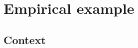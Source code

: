\documentclass[10pt,letterpaper]{article}
\providecommand{\DIFaddbegin}{} %
\providecommand{\DIFaddend}{} %
\providecommand{\DIFdelbegin}{} %
\providecommand{\DIFdelend}{} %
\newcommand{\DIFscaledelfig}{0.5}
\newlength{\DIFdelgraphicswidth} %
\newlength{\DIFdelgraphicsheight} %
\newcommand{\DIFaddincludegraphics}[2][]{{\color{blue}\fbox{\DIFOincludegraphics[#1]{#2}}}} %
\newcommand{\DIFdelincludegraphics}[2][]{%
\sbox{\DIFdelgraphicsbox}{\DIFOincludegraphics[#1]{#2}}%
\settoboxwidth{\DIFdelgraphicswidth}{\DIFdelgraphicsbox} %
\settoboxtotalheight{\DIFdelgraphicsheight}{\DIFdelgraphicsbox} %
\scalebox{\DIFscaledelfig}{%
\parbox[b]{\DIFdelgraphicswidth}{\usebox{\DIFdelgraphicsbox}\\[-\baselineskip] \rule{\DIFdelgraphicswidth}{0em}}\llap{\resizebox{\DIFdelgraphicswidth}{\DIFdelgraphicsheight}{%
\setlength{\unitlength}{\DIFdelgraphicswidth}%
\begin{picture}(1,1)%
\thicklines\linethickness{2pt} %
{\color[rgb]{1,0,0}\put(0,0){\framebox(1,1){}}}%
{\color[rgb]{1,0,0}\put(0,0){\line( 1,1){1}}}%
{\color[rgb]{1,0,0}\put(0,1){\line(1,-1){1}}}%
\end{picture}%
}\hspace*{3pt}}} %
} %
\DeclareRobustCommand{\DIFaddbegin}{\DIFOaddbegin \let\includegraphics\DIFaddincludegraphics} %
\DeclareRobustCommand{\DIFaddend}{\DIFOaddend \let\includegraphics\DIFOincludegraphics} %
\DeclareRobustCommand{\DIFdelbegin}{\DIFOdelbegin \let\includegraphics\DIFdelincludegraphics} %
\DeclareRobustCommand{\DIFdelend}{\DIFOaddend \let\includegraphics\DIFOincludegraphics} %
\begin{document}
\DIFdelbegin %
\DIFdelend \DIFaddbegin \hypertarget{empirical-example}{%
\section{Empirical example}\label{empirical-example}}
\DIFaddend 

\DIFdelbegin %
\DIFdelend \DIFaddbegin \hypertarget{context}{%
\subsection{Context}\label{context}}
\DIFaddend 
\end{document}
